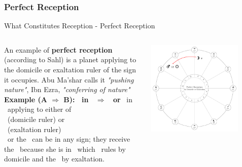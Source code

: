 \subsubsection{Perfect Reception}
\begin{frame}[t]{What Constitutes Reception - Perfect Reception}
\vspace{0.1cm}
\begin{columns}[T, onlytextwidth]
An example of \textbf{perfect reception} (according to Sahl\footnotemark[1]) is a planet applying to the domicile or exaltation ruler of the sign it occupies. Abu Ma'shar calls it \textsl{"pushing nature"}, Ibn Ezra, \textsl{"conferring of nature"}\footnotemark[2] \\
\vspace{0.2cm}
\textbf{Example (A $\Rightarrow$ B): \Moon\ in \Aries\ $\Rightarrow$ \Mars\ or \Sun} 
\ul
\vspace{0.2cm}
\Moon\ in \Aries\ applying to either of \\
\Mars\ (domicile ruler) or \\
\Sun\ (exaltation ruler) \\
\vspace{0.2cm}
\Mars\ or the \Sun\ can be in any sign; they receive the \Moon\ because she is in \Aries\ which \Mars\ rules by domicile and the \Sun\ by exaltation.\\

\vspace{-0.5cm}

\begin{center}
{\includegraphics[width=0.8\textwidth]{charts/01-perfect-reception}} \\
\end{center}

\end{columns}
\vspace{0.2cm}
\end{frame}
